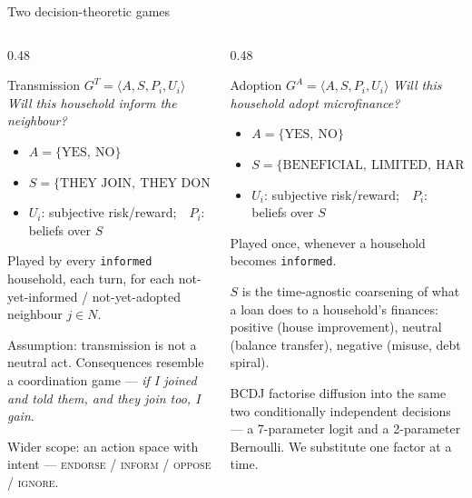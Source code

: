 \documentclass[aspectratio=169,10pt]{beamer}
\newcommand{\hl}[1]{\textcolor{mLightBrown}{#1}}
\newcommand{\srcnote}[1]{{\tiny\color{gray}#1}}
\begin{document}
\begin{frame}{Two decision-theoretic games}
  \begin{columns}[T,onlytextwidth]
    \begin{column}{0.48\textwidth}
      \begin{block}{Transmission $G^T=\langle A,S,P_i,U_i\rangle$}
        \scriptsize
        \emph{Will this household inform the neighbour?}
        \begin{itemize}\scriptsize
          \item $A=\{\text{YES},\ \text{NO}\}$
          \item $S=\{\text{THEY JOIN},\ \text{THEY DON'T JOIN}\}$
          \item $U_i$: subjective risk/reward;\ \ $P_i$: beliefs over $S$
        \end{itemize}
      \end{block}
      \scriptsize
      Played by every \texttt{informed} household, each turn, for each
      not-yet-informed / not-yet-adopted neighbour $j\in N$.
      \smallskip

      Assumption: transmission is \hl{not a neutral act}. Consequences resemble a
      coordination game --- \emph{if I joined and told them, and they join too, I
      gain}.
      \smallskip

      \srcnote{Wider scope: an action space with intent ---
        \textsc{endorse} / \textsc{inform} / \textsc{oppose} / \textsc{ignore}.}
    \end{column}
    \begin{column}{0.48\textwidth}
      \begin{block}{Adoption $G^A=\langle A,S,P_i,U_i\rangle$}
        \scriptsize
        \emph{Will this household adopt microfinance?}
        \begin{itemize}\scriptsize
          \item $A=\{\text{YES},\ \text{NO}\}$
          \item $S=\{\text{BENEFICIAL},\ \text{LIMITED},\ \text{HARMFUL}\}$
          \item $U_i$: subjective risk/reward;\ \ $P_i$: beliefs over $S$
        \end{itemize}
      \end{block}
      \scriptsize
      Played once, whenever a household becomes \texttt{informed}.
      \smallskip

      $S$ is the time-agnostic coarsening of what a loan does to a household's
      finances: positive (house improvement), neutral (balance transfer),
      negative (misuse, debt spiral).
      \smallskip

      \srcnote{BCDJ factorise diffusion into the same two conditionally
        independent decisions --- a 7-parameter logit and a 2-parameter
        Bernoulli. We substitute one factor at a time.}
    \end{column}
  \end{columns}
\end{frame}
\end{document}
